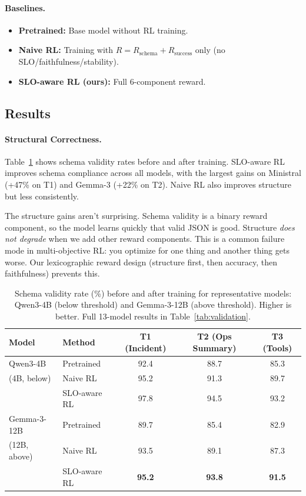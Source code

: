 \documentclass[11pt]{article}
\begin{document}
\paragraph{Baselines.}
\begin{itemize}[leftmargin=12pt]
    \item \textbf{Pretrained:} Base model without RL training.
    \item \textbf{Naive RL:} Training with $R = R_{\text{schema}} + R_{\text{success}}$ only (no SLO/faithfulness/stability).
    \item \textbf{SLO-aware RL (ours):} Full 6-component reward.
\end{itemize}

\subsection{Results}

\paragraph{Structural Correctness.}
Table~\ref{tab:structure} shows schema validity rates before and after training.
SLO-aware RL improves schema compliance across all models, with the largest gains on Ministral (+47\% on T1) and Gemma-3 (+22\% on T2).
Naive RL also improves structure but less consistently.

The structure gains aren't surprising.  Schema validity is a binary reward component, so the model learns quickly that valid JSON is good.
Structure \emph{does not degrade} when we add other reward components.
This is a common failure mode in multi-objective RL: you optimize for one thing and another thing gets worse.
Our lexicographic reward design (structure first, then accuracy, then faithfulness) prevents this.

\begin{table}[t]
\centering
\caption{Schema validity rate (\%) before and after training for representative models: Qwen3-4B (below threshold) and Gemma-3-12B (above threshold).  Higher is better.  Full 13-model results in Table~\ref{tab:validation}.}
\label{tab:structure}
\begin{tabular}{l l ccc}
\toprule
\textbf{Model} & \textbf{Method} & \textbf{T1 (Incident)} & \textbf{T2 (Ops Summary)} & \textbf{T3 (Tools)} \\
\midrule
Qwen3-4B & Pretrained & 92.4 & 88.7 & 85.3 \\
(4B, below) & Naive RL & 95.2 & 91.3 & 89.7 \\
& SLO-aware RL & 97.8 & 94.5 & 93.2 \\
\midrule
Gemma-3-12B & Pretrained & 89.7 & 85.4 & 82.9 \\
(12B, above) & Naive RL & 93.5 & 89.1 & 87.3 \\
& SLO-aware RL & \textbf{95.2} & \textbf{93.8} & \textbf{91.5} \\
\bottomrule
\end{tabular}
\end{table}
\end{document}
